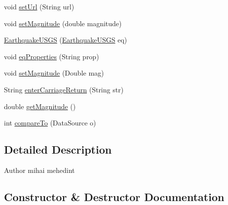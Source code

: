 \begin{DoxyCompactItemize}
void \hyperlink{classbridges_1_1data__src__dependent_1_1_earthquake_u_s_g_s_aaa9d26333e7b80d0f72da58ea2ad41d1}{set\+Url} (String url)
\item 
void \hyperlink{classbridges_1_1data__src__dependent_1_1_earthquake_u_s_g_s_ad7902d80cbbe11046858db1f2792e99d}{set\+Magnitude} (double magnitude)
\item 
\hyperlink{classbridges_1_1data__src__dependent_1_1_earthquake_u_s_g_s_a6b9281a299d6e60736355eb8833f9e0d}{Earthquake\+U\+S\+G\+S} (\hyperlink{classbridges_1_1data__src__dependent_1_1_earthquake_u_s_g_s}{Earthquake\+U\+S\+G\+S} eq)
\item 
void \hyperlink{classbridges_1_1data__src__dependent_1_1_earthquake_u_s_g_s_acc0ba6890ee5963f88a399523f009ae4}{eq\+Properties} (String prop)
\item 
void \hyperlink{classbridges_1_1data__src__dependent_1_1_earthquake_u_s_g_s_a34a4c6ebe01c5daa7c86b3a4207d633f}{set\+Magnitude} (Double mag)
\item 
String \hyperlink{classbridges_1_1data__src__dependent_1_1_earthquake_u_s_g_s_aade0ce9a2fee927b015f5eb495c481e1}{enter\+Carriage\+Return} (String str)
\item 
double \hyperlink{classbridges_1_1data__src__dependent_1_1_earthquake_u_s_g_s_a3ec5d753277d6287b222448ff2477291}{get\+Magnitude} ()
\item 
int \hyperlink{classbridges_1_1data__src__dependent_1_1_earthquake_u_s_g_s_a60cad0a286825f77cd2900265acae982}{compare\+To} (Data\+Source o)
\end{DoxyCompactItemize}


\subsection{Detailed Description}
\begin{DoxyAuthor}{Author}
mihai mehedint 
\end{DoxyAuthor}


\subsection{Constructor \& Destructor Documentation}
\hypertarget{classbridges_1_1data__src__dependent_1_1_earthquake_u_s_g_s_a681da199afeab00ae170416841f235e2}{}
